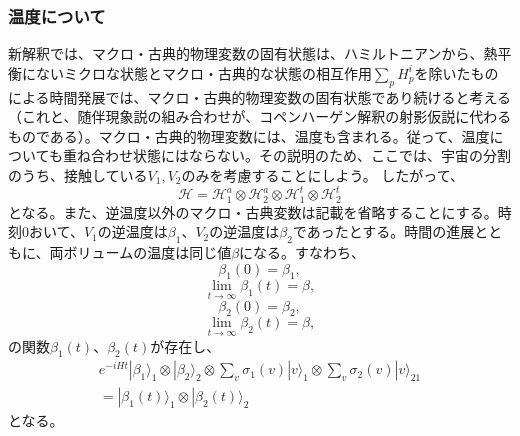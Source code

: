 \subsubsection{温度について}
新解釈では、マクロ・古典的物理変数の固有状態は、ハミルトニアンから、熱平衡にないミクロな状態とマクロ・古典的な状態の相互作用$\sum_pH_p^i$を除いたものによる時間発展では、マクロ・古典的物理変数の固有状態であり続けると考える（これと、随伴現象説の組み合わせが、コペンハーゲン解釈の射影仮説に代わるものである）。マクロ・古典的物理変数には、温度も含まれる。従って、温度についても重ね合わせ状態にはならない。その説明のため、ここでは、宇宙の分割のうち、接触している${V_1,V_2}$のみを考慮することにしよう。 したがって、
\begin{equation}
    \mathcal{H} = \mathcal{H}_1^a \otimes \mathcal{H}_2^a \otimes \mathcal{H}_1^t \otimes \mathcal{H}_2^t 
\end{equation}
となる。また、逆温度以外のマクロ・古典変数は記載を省略することにする。時刻$0$おいて、$V_1$の逆温度は$\beta_1$、$V_2$の逆温度は$\beta_2$であったとする。時間の進展とともに、両ボリュームの温度は同じ値$\beta$になる。すなわち、
\begin{equation}
    \beta_1(0) = \beta_1,
\end{equation}
\begin{equation}
    \lim_{t \to \infty} \beta_1(t) = \beta,
\end{equation}
\begin{equation}
    \beta_2(0) = \beta_2,
\end{equation}
\begin{equation}
    \lim_{t \to \infty} \beta_2(t) = \beta,
\end{equation}
の関数$\beta_1(t)$、$\beta_2(t)$が存在し、
\begin{equation}
\begin{aligned}
    e^{-iHt}|\beta_1 \rangle_1 \otimes |\beta_2 \rangle_2 \otimes \sum_v \sigma_1(v) |v\rangle_1 \otimes \sum_v \sigma_2(v) |v\rangle_21\\
    =  |\beta_1(t) \rangle_1 \otimes |\beta_2(t)\rangle_2 
\end{aligned}
\end{equation}
となる。\\
　